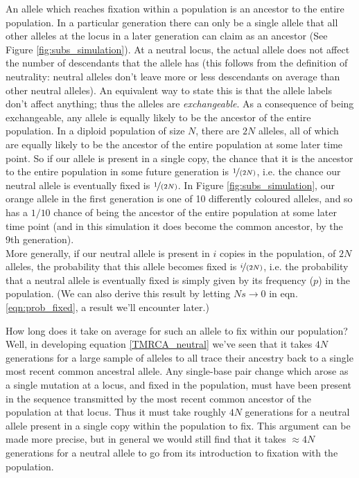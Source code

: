 An allele which reaches fixation within a population is an ancestor to the
entire population. In a particular generation there can only be a single allele
that all other alleles at the locus in a later generation can claim as an
ancestor (See Figure \ref{fig:subs_simulation}). At a neutral locus, the actual allele does not affect the number of
descendants that the allele has (this follows from the definition of
neutrality: neutral alleles don't leave more or less descendants on average than other neutral alleles).
An equivalent way to state this is that the allele labels don't affect
anything; thus the alleles are \emph{exchangeable}. As a consequence of being exchangeable,
any allele is equally likely to be the ancestor of the entire population.  In a
diploid population of size $N$, there are $2N$ alleles, all of which are
equally likely to be the ancestor of the entire population at some later time
point. So if our allele is present in a single copy, the chance that it is the
ancestor to the entire population in some future generation is
$\nicefrac{1}{(2N)}$, i.e. the chance our neutral allele is eventually fixed is
$\nicefrac{1}{(2N)}$.  In Figure \ref{fig:subs_simulation}, our orange allele
in the first generation is one of 10 differently coloured alleles, and so has a
$1/10$ chance of being the ancestor of the entire population at some later time
point (and in this simulation it does become the common ancestor, by the 9th generation).\\

More generally, if our neutral allele is present in $i$ copies in the
population, of $2N$ alleles, the probability that this allele becomes fixed is
$\nicefrac{i}{(2N)}$, i.e. the probability that a neutral allele is eventually
fixed is simply given by its frequency ($p$) in the population.  (We can also
derive this result by letting $Ns \rightarrow 0$ in eqn.
\eqref{eqn:prob_fixed}, a result we'll encounter later.)



How long does it take on average for
such an allele to fix within our population? Well, in developing
equation \eqref{TMRCA_neutral} we've seen that it takes $4N$
generations for a large sample of alleles to all trace their ancestry back to a
single most recent common ancestral allele. Any single-base pair change which arose as a single mutation at a locus, and fixed in the population, must have been present in the sequence transmitted by the most recent common ancestor of the population at that locus. Thus it must take roughly $4N$ generations
for a neutral allele present in a single copy within the population to fix.
 This argument can be made more
precise, but in general we would still find that it takes $\approx 4N$
generations for a neutral allele to go from its introduction to fixation with
the population.   \\

